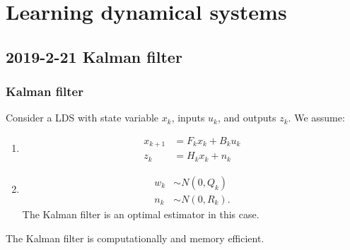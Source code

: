 \chapter{Learning dynamical systems}
\section{2019-2-21 Kalman filter}

\subsection{Kalman filter}
Consider a LDS with state variable $x_k$, inputs $u_k$, and outputs $z_k$. We assume:
\begin{enumerate}
\item
\begin{align}
x_{k+1} &= F_k x_k + B_k u_k\\
z_k&=H_kx_k + n_k
\end{align}
\item
\begin{align}
w_k &\sim N(0,Q_k)\\
n_k &\sim N(0,R_k).
\end{align}
The Kalman filter is an optimal estimator in this case.
\end{enumerate}
The Kalman filter is computationally and memory efficient.

